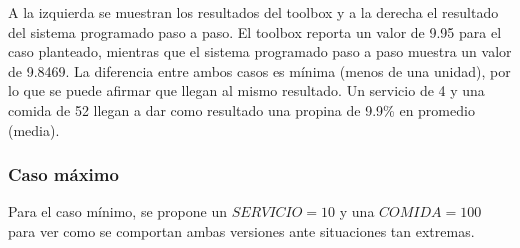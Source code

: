 \documentclass[11pt, letterpaper]{article}
\begin{document}
A la izquierda se muestran los resultados del toolbox y a la derecha el resultado del sistema programado paso a paso. El toolbox reporta un valor de 9.95 para el caso planteado, mientras que el sistema programado paso a paso muestra un valor de 9.8469. La diferencia entre ambos casos es mínima (menos de una unidad), por lo que se puede afirmar que llegan al mismo resultado. Un servicio de 4 y una comida de 52 llegan a dar como resultado una propina de 9.9\% en promedio (media).

\newpage

\subsubsection{Caso máximo}
Para el caso mínimo, se propone un $SERVICIO = 10$ y una $COMIDA = 100$ para ver como se comportan ambas versiones ante situaciones tan extremas.
\end{document}
